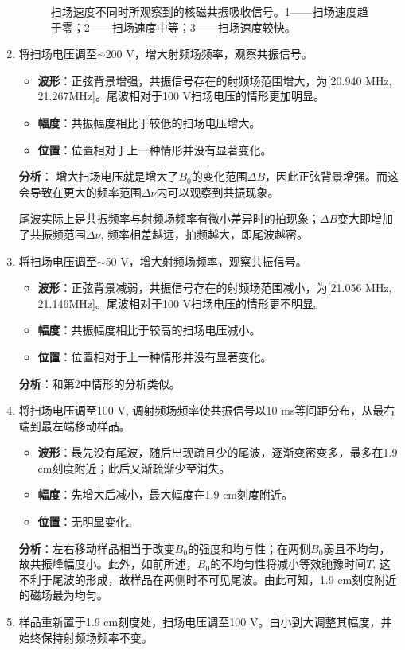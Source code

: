 \documentclass[font=default]{mpltx}
\begin{document}
\begin{enumerate}
\begin{figure}
  \caption{扫场速度不同时所观察到的核磁共振吸收信号。1——扫场速度趋于零；2——扫场速度中等；3——扫场速度较快。}
  \label{fig:tail}
\end{figure}
\item 将扫场电压调至$\sim$200 V，增大射频场频率，观察共振信号。
  \begin{itemize}
  \item \textbf{波形}：正弦背景增强，共振信号存在的射频场范围增大，为[20.940 MHz, 21.267MHz]。尾波相对于100 V扫场电压的情形更加明显。
  \item \textbf{幅度}：共振幅度相比于较低的扫场电压增大。
  \item \textbf{位置}：位置相对于上一种情形并没有显著变化。
  \end{itemize}
  \textbf{分析}：
  增大扫场电压就是增大了$B_0$的变化范围$\Delta B$，因此正弦背景增强。而这会导致在更大的频率范围$\Delta \nu$内可以观察到共振现象。\par
  尾波实际上是共振频率与射频场频率有微小差异时的拍现象；$\Delta B$变大即增加了共振频范围$\Delta\nu$, 频率相差越远，拍频越大，即尾波越密。
\item 将扫场电压调至$\sim$50 V，增大射频场频率，观察共振信号。
\begin{itemize}
  \item \textbf{波形}：正弦背景减弱，共振信号存在的射频场范围减小，为[21.056 MHz, 21.146MHz]。尾波相对于100 V扫场电压的情形更不明显。
  \item \textbf{幅度}：共振幅度相比于较高的扫场电压减小。
  \item \textbf{位置}：位置相对于上一种情形并没有显著变化。
\end{itemize}
\textbf{分析}：和第2中情形的分析类似。
\item 将扫场电压调至100 V, 调射频场频率使共振信号以10 ms等间距分布，从最右端到最左端移动样品。
  \begin{itemize}
  \item \textbf{波形}：最先没有尾波，随后出现疏且少的尾波，逐渐变密变多，最多在1.9 cm刻度附近；此后又渐疏渐少至消失。
  \item \textbf{幅度}：先增大后减小，最大幅度在1.9 cm刻度附近。
  \item \textbf{位置}：无明显变化。
  \end{itemize}
  \textbf{分析}：左右移动样品相当于改变$B_0$的强度和均与性；在两侧$B_0$弱且不均匀，故共振峰幅度小。此外，如前所述，$B_0$的不均匀性将减小等效驰豫时间$T$, 这不利于尾波的形成，故样品在两侧时不可见尾波。由此可知，1.9 cm刻度附近的磁场最为均匀。
\item 样品重新置于1.9 cm刻度处，扫场电压调至100 V。由小到大调整其幅度，并始终保持射频场频率不变。

\end{enumerate}
\end{document}
